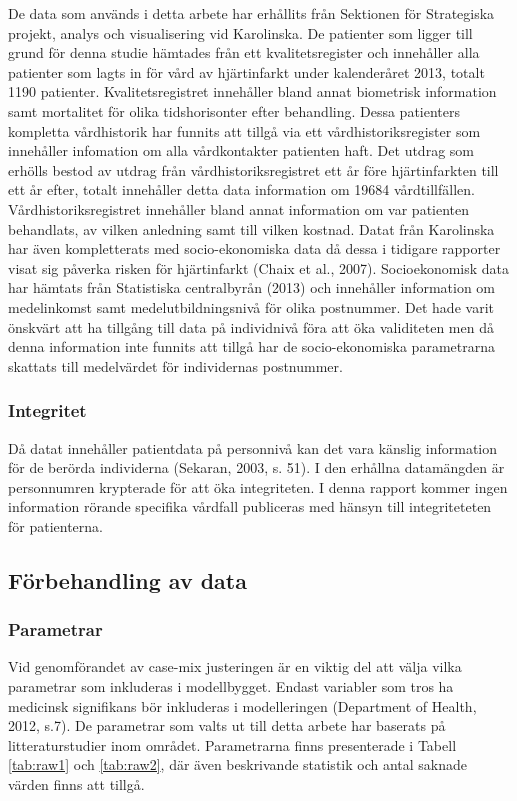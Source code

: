 De data som används i detta arbete har erhållits från Sektionen för Strategiska projekt, analys och visualisering vid Karolinska. De patienter som ligger till grund för denna studie hämtades från ett kvalitetsregister och innehåller alla patienter som lagts in för vård av hjärtinfarkt under kalenderåret 2013, totalt 1190 patienter. Kvalitetsregistret innehåller bland annat biometrisk information samt mortalitet för olika tidshorisonter efter behandling. Dessa patienters kompletta vårdhistorik har funnits att tillgå via ett vårdhistoriksregister som innehåller infomation om alla vårdkontakter patienten haft. Det utdrag som erhölls bestod av utdrag från vårdhistoriksregistret ett år före hjärtinfarkten till ett år efter, totalt innehåller detta data information om 19684 vårdtillfällen. Vårdhistoriksregistret innehåller bland annat information om var patienten behandlats, av vilken anledning samt till vilken kostnad. Datat från Karolinska har även kompletterats med socio-ekonomiska data då dessa i tidigare rapporter visat sig påverka risken för hjärtinfarkt (Chaix et al., 2007). Socioekonomisk data har hämtats från Statistiska centralbyrån (2013) och innehåller information om medelinkomst samt medelutbildningsnivå för olika postnummer. Det hade varit önskvärt att ha tillgång till data på individnivå föra att öka validiteten men då denna information inte funnits att tillgå har de socio-ekonomiska parametrarna skattats till medelvärdet för individernas postnummer.

\subsubsection{Integritet}

Då datat innehåller patientdata på personnivå kan det vara känslig information för de berörda individerna (Sekaran, 2003, s. 51). I den erhållna datamängden är personnumren krypterade för att öka integriteten. I denna rapport kommer ingen information rörande specifika vårdfall publiceras med hänsyn till integriteteten för patienterna.

\subsection{Förbehandling av data}

\subsubsection{Parametrar}

Vid genomförandet av case-mix justeringen är en viktig del att välja vilka parametrar som inkluderas i modellbygget. Endast variabler som tros ha medicinsk signifikans bör inkluderas i modelleringen (Department of Health, 2012, s.7). De parametrar som valts ut till detta arbete har baserats på litteraturstudier inom området. Parametrarna finns presenterade i Tabell \ref{tab:raw1} och \ref{tab:raw2}, där även beskrivande statistik och antal saknade värden finns att tillgå.

